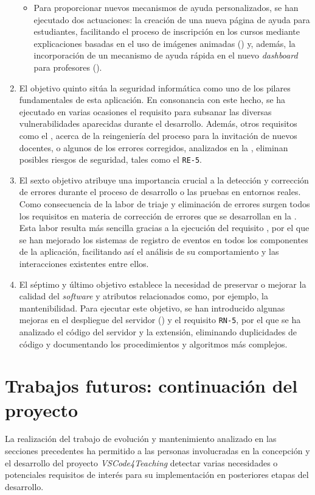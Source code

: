 \begin{enumerate}
\begin{itemize}
        \item Para proporcionar nuevos mecanismos de ayuda personalizados, se han ejecutado dos actuaciones: la creación de una nueva página de ayuda para estudiantes, facilitando el proceso de inscripción en los cursos mediante explicaciones basadas en el uso de imágenes animadas () y, además, la incorporación de un mecanismo de ayuda rápida en el nuevo \textit{dashboard} para profesores ().
    \end{itemize}
    \item El objetivo quinto sitúa la seguridad informática como uno de los pilares fundamentales de esta aplicación. En consonancia con este hecho, se ha ejecutado en varias ocasiones el requisito  para subsanar las diversas vulnerabilidades aparecidas durante el desarrollo. Además, otros requisitos como el , acerca de la reingeniería del proceso para la invitación de nuevos docentes, o algunos de los errores corregidos, analizados en la , eliminan posibles riesgos de seguridad, tales como el \texttt{RE-5}.
    \item El sexto objetivo atribuye una importancia crucial a la detección y corrección de errores durante el proceso de desarrollo o las pruebas en entornos reales. Como consecuencia de la labor de triaje y eliminación de errores surgen todos los requisitos en materia de corrección de errores que se desarrollan en la . Esta labor resulta más sencilla gracias a la ejecución del requisito , por el que se han mejorado los sistemas de registro de eventos en todos los componentes de la aplicación, facilitando así el análisis de su comportamiento y las interacciones existentes entre ellos.
    \item El séptimo y último objetivo establece la necesidad de preservar o mejorar la calidad del \textit{software} y atributos relacionados como, por ejemplo, la mantenibilidad. Para ejecutar este objetivo, se han introducido algunas mejoras en el despliegue del servidor () y el requisito \texttt{RN-5}, por el que se ha analizado el código del servidor y la extensión, eliminando duplicidades de código y documentando los procedimientos y algoritmos más complejos.
\end{enumerate}

\section{Trabajos futuros: continuación del proyecto}
\label{subsec:trabajosFuturos}
La realización del trabajo de evolución y mantenimiento analizado en las secciones precedentes ha permitido a las personas involucradas en la concepción y el desarrollo del proyecto \textit{VSCode4Teaching} detectar varias necesidades o potenciales requisitos de interés para su implementación en posteriores etapas del desarrollo.

